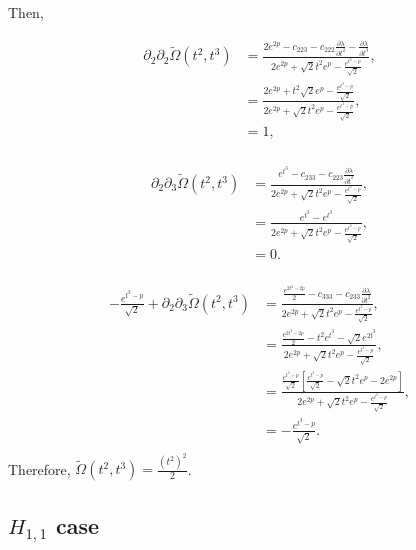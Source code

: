 \documentclass{article}
\theoremstyle{definition}
\begin{document}
Then,


 \begin{equation}
 \begin{split}
\partial_2\partial_2\tilde\Omega(t^2,t^3)&= \frac{ 2e^{2p} -c_{223}-c_{222}\frac{\partial \lambda}{\partial t^2}-\frac{\partial \lambda}{\partial t^3}}{ 2e^{2p}+\sqrt{2}t^2e^p-\frac{e^{t^3-p}}{\sqrt{2}} },\\
&= \frac{ 2e^{2p} +t^2\sqrt{2}e^p-\frac{e^{t^3-p}}{\sqrt{2}}}{ 2e^{2p}+\sqrt{2}t^2e^p-\frac{e^{t^3-p}}{\sqrt{2}} },\\
&=1,\\
\end{split}
\end{equation}

 \begin{equation}
 \begin{split}
\partial_2\partial_3\tilde\Omega(t^2,t^3)&= \frac{ e^{t^3} -c_{233}-c_{223}\frac{\partial \lambda}{\partial t^2}}{ 2e^{2p}+\sqrt{2}t^2e^p-\frac{e^{t^3-p}}{\sqrt{2}} },\\
&= \frac{ e^{t^3}-e^{t^3}}{ 2e^{2p}+\sqrt{2}t^2e^p-\frac{e^{t^3-p}}{\sqrt{2}} },\\
&=0.\\
\end{split}
\end{equation}



 \begin{equation}
 \begin{split}
- \frac{e^{t^3-p}}{\sqrt{2}} +\partial_2\partial_3\tilde\Omega(t^2,t^3)&=\frac{ \frac{e^{2t^3-2p}}{2} -c_{333}-c_{233}\frac{\partial \lambda}{\partial t^2}}{ 2e^{2p}+\sqrt{2}t^2e^p-\frac{e^{t^3-p}}{\sqrt{2}} },\\
&=\frac{ \frac{e^{2t^3-2p}}{2} -t^2e^{t^3}-\sqrt{2}e^{2t^3} }{ 2e^{2p}+\sqrt{2}t^2e^p-\frac{e^{t^3-p}}{\sqrt{2}} },\\
&=\frac{ \frac{e^{t^3-p}}{\sqrt{2}} \left[  \frac{e^{t^3-p}}{\sqrt{2}} -\sqrt{2}t^2e^{p}-2e^{2p}\right] }{ 2e^{2p}+\sqrt{2}t^2e^p-\frac{e^{t^3-p}}{\sqrt{2}} },\\
&=- \frac{e^{t^3-p}}{\sqrt{2}}.\\
\end{split}
\end{equation}
Therefore, $\tilde\Omega(t^2,t^3)=\frac{(t^2)^2}{2}$. 


\subsection{$H_{1,1}$  case }
\end{document}
